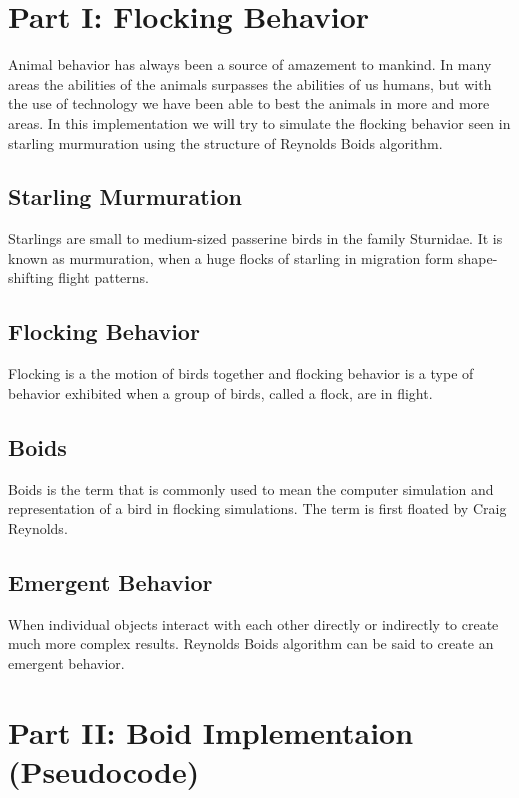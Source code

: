 \documentclass[12pt]{article}
\begin{document}

\tableofcontents
\pagebreak

\section{Part I: Flocking Behavior}
Animal behavior has always been a source of amazement to mankind. In many areas the abilities of the animals surpasses the abilities of us humans, but with the use of technology we have been able to best the animals in more and more areas. In this implementation we will try to simulate the flocking behavior seen in starling murmuration using the structure of Reynolds Boids algorithm.

\subsection{Starling Murmuration}
Starlings are small to medium-sized passerine birds in the family Sturnidae. It is known as murmuration, when a huge flocks of starling in migration form shape-shifting flight patterns.

\subsection{Flocking Behavior}
Flocking is a the motion of birds together and flocking behavior is a type of behavior exhibited when a group of birds, called a flock, are in flight.

\subsection{Boids}
Boids is the term that is commonly used to mean the computer simulation and representation of a bird in flocking simulations. The term is first floated by Craig Reynolds.

\subsection{Emergent Behavior}
When individual objects interact with each other directly or indirectly to create much more complex results. Reynolds Boids algorithm can be said to create an emergent behavior.

\newpage

\section{Part II: Boid Implementaion (Pseudocode)}
\end{document}
